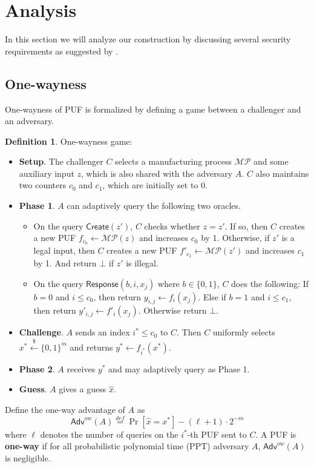 \documentclass[12pt]{article}
\newcommand{\eqdef}{\stackrel{def}{=}}
\newcommand{\bits}{\{0,1\}}
\newcommand{\getsr}{\stackrel{\$}{\gets}}
\newcommand{\Adv}{\mathsf{Adv}}
\newcommand{\MP}{\mathcal{MP}}
\newcommand{\Create}{\mathsf{Create}}
\newcommand{\Response}{\mathsf{Response}}
\theoremstyle{definition}
\newtheorem{definition}[theorem]{Definition}
\begin{document}
\section{Analysis}
\label{sec:a}
In this section we will analyze our construction by discussing several security requirements as suggested by \cite{sadeghi2016towards}.

\subsection{One-wayness}
One-wayness of PUF is formalized by defining a game between a challenger and an adversary.
\begin{definition}
\label{def:ow}
One-wayness game:
\begin{itemize}
\item {\bf Setup}. The challenger $C$ selects a manufacturing process $\MP$ and some auxiliary input $z$, which is also shared with the adversary $A$. $C$ also maintains two counters $c_0$ and $c_1$, which are initially set to 0.
\item {\bf Phase 1}. $A$ can adaptively query the following two oracles.
	\begin{itemize}
	\item On the query $\Create(z')$, $C$ checks whether $z=z'$. If so, then $C$ creates a new PUF $f_{c_0} \gets \MP(z)$ and increases $c_0$ by 1. Otherwise, if $z'$ is a legal input, then $C$ creates a new PUF $f'_{c_1} \gets \MP(z')$ and increases $c_1$ by 1. And return $\bot$ if $z'$ is illegal.
	\item On the query $\Response(b,i,x_j)$ where $b\in\bits$, $C$ does the following: If $b=0$ and $i \leq c_0$, then return $y_{i,j} \gets f_{i}(x_j)$. Else if $b=1$ and $i \leq c_1$, then return $y'_{i,j} \gets f'_{i}(x_j)$. Otherwise return $\bot$.
	\end{itemize}
\item {\bf Challenge}. $A$ sends an index $i^* \leq c_0$ to $C$. Then $C$ uniformly selects $x^* \getsr \bits^m$ and returns $y^* \gets f_{i^*}(x^*)$.
\item {\bf Phase 2}. $A$ receives $y^*$ and may adaptively query as Phase 1.
\item {\bf Guess}. $A$ gives a guess $\hat{x}$.
\end{itemize}
Define the one-way advantage of $A$ as
$$\Adv^{ow}(A) \eqdef \Pr[\hat{x} = x^*] - (\ell + 1) \cdot 2^{-m}$$
where $\ell$ denotes the number of queries on the $i^*$-th PUF sent to $C$. A PUF is {\bf one-way} if for all probabilistic polynomial time (PPT) adversary $A$, $\Adv^{ow}(A)$ is negligible.
\end{definition}
\end{document}
